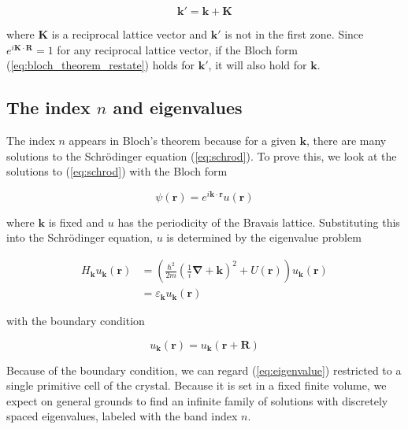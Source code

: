			\begin{equation} \label{k_prime}
				\mathbf{k'=k+K}
			\end{equation}

		where $\mathbf{K}$ is a reciprocal lattice vector and $\mathbf{k'}$ is not in the first zone.  Since $e^{i\mathbf{K \cdot R}}=1$ for any reciprocal lattice vector, if the Bloch form (\ref{eq:bloch_theorem_restate}) holds for $\boldsymbol{k'}$, it will also hold for $\boldsymbol{k}$.

	\subsection{The index $n$ and eigenvalues}
		The index $n$ appears in Bloch's theorem because for a given $\mathbf{k}$, there are many solutions to the Schrödinger equation (\ref{eq:schrod}). To prove this, we look at the solutions to (\ref{eq:schrod}) with the Bloch form

		\begin{equation*}
			\psi(\mathbf{r})
			= e^{i\mathbf{k\cdot r}}
			u(\mathbf{r})
		\end{equation*}

		where $\mathbf{k}$ is fixed and $u$ has the periodicity of the Bravais lattice. Substituting this into the Schrödinger equation, $u$ is determined by the eigenvalue problem

		\begin{align} \label{eq:eigenvalue}
			H_{\mathbf{k}} u_{\mathbf{k}} (\mathbf{r})
			&= \left( \frac{\hbar^2}{2m}
			\left(\frac{1}{i} \boldsymbol{\nabla}
			+ \mathbf{k} \right)^2
			+ U(\mathbf{r}) \right)
			u_\mathbf{k} (\mathbf{r}) \\
			&= \varepsilon_{\mathbf{k}} 
			u_\mathbf{k}(\mathbf{r})
		\end{align}

		with the boundary condition

		\begin{equation*}
			u_\mathbf{k} (\mathbf{r})
			= u_\mathbf{k} (\mathbf{r} + \mathbf{R})
		\end{equation*}

		Because of the boundary condition, we can regard (\ref{eq:eigenvalue}) restricted to a single primitive cell of the crystal. Because it is set in a fixed finite volume, we expect on general grounds to find an infinite family of solutions with discretely spaced eigenvalues, labeled with the band index $n$.

